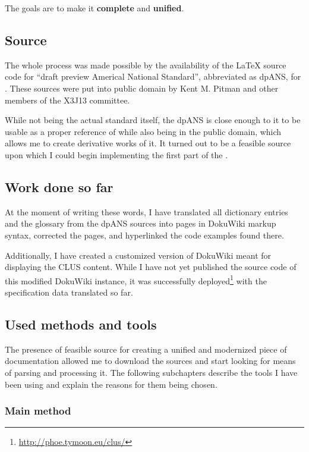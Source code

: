 The goals are to make it \textbf{complete} and \textbf{unified}.

\subsection{Source}

The whole process was made possible by the availability of the \LaTeX{} source code for ``draft preview Americal National Standard'', abbreviated as dpANS, for \cl{}. These sources were put into public domain by Kent M. Pitman and other members of the X3J13 committee.

While not being the actual standard itself, the dpANS is close enough to it to be usable as a proper reference of \cl{} while also being in the public domain, which allows me to create derivative works of it. It turned out to be a feasible source upon which I could begin implementing the first part of the \us{}.

\subsection{Work done so far}

At the moment of writing these words, I have translated all dictionary entries and the glossary from the dpANS sour\-ces into pages in Doku\-Wiki markup syntax, corrected the pages, and hyperlinked the code examples found there.

Additionally, I have created a customized version of Doku\-Wiki meant for displaying the CLUS content. While I have not yet published the source code of this modified Doku\-Wiki instance, it was successfully deployed\footnote{\url{http://phoe.tymoon.eu/clus/}} with the specification data translated so far.

\subsection{Used methods and tools}

The presence of feasible source for creating a unified and modernized piece of \cl{} documentation allowed me to download the sources and start looking for means of parsing and processing it. The following subchapters describe the tools I have been using and explain the reasons for them being chosen.

\subsubsection{Main method}

